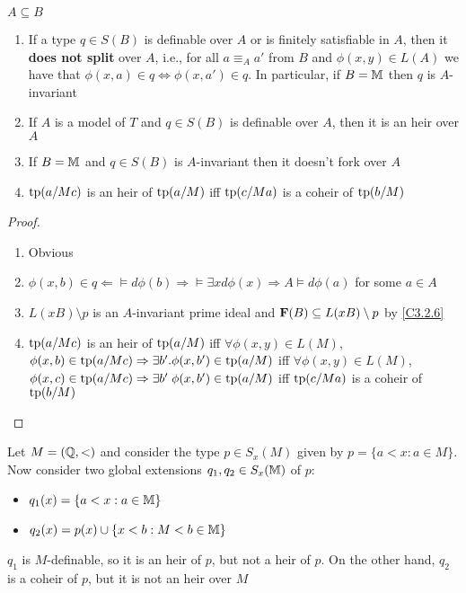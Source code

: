 \documentclass[11pt]{article}
\begin{document}
\begin{exercise}
\label{exC3.3.3}
\(A\subseteq B\)
\begin{enumerate}
\item If a type \(q\in S(B)\) is definable over \(A\) or is finitely satisfiable in \(A\), then it
\textbf{does not split} over \(A\), i.e., for all \(a\equiv_Aa'\) from \(B\) and \(\phi(x,y)\in L(A)\) we have
that \(\phi(x,a)\in q\Leftrightarrow\phi(x,a')\in q\). In particular, if \(B=\mathbb{M}\) then \(q\) is \(A\)-invariant
\item If \(A\) is a model of \(T\) and \(q\in S(B)\) is definable over \(A\), then it is an heir over \(A\)
\item If \(B=\mathbb{M}\) and \(q\in S(B)\) is \(A\)-invariant then it doesn't fork over \(A\)
\item \(\operatorname{tp}(a/Mc)\) is an heir of \(\operatorname{tp}(a/M)\) iff \(\operatorname{tp}(c/Ma)\) is a coheir of \(\operatorname{tp}(b/M)\)
\end{enumerate}
\end{exercise}

\begin{proof}
\begin{enumerate}
\item Obvious
\item \(\phi(x,b)\in q\Leftarrow\vDash d\phi(b)\Rightarrow\vDash\exists xd\phi(x)\Rightarrow A\vDash d\phi(a)\) for some \(a\in A\)
\item \(L(xB)\setminus p\) is an \(A\)-invariant prime ideal and \(\operatorname{\textbf{F}}(B)\subseteq L(xB)\setminus p\) by \ref{C3.2.6}
\item \(\operatorname{tp}(a/Mc)\) is an heir of \(\operatorname{tp}(a/M)\)
iff \(\forall\phi(x,y)\in L(M)\), \(\phi(x,b)\in\operatorname{tp}(a/Mc)\Rightarrow\exists b'.\phi(x,b')\in\operatorname{tp}(a/M)\) iff
\(\forall \phi(x,y)\in L(M)\), \(\phi(x,c)\in\operatorname{tp}(a/Mc)\Rightarrow\exists b'\;\phi(x,b')\in\operatorname{tp}(a/M)\) iff \(\operatorname{tp}(c/Ma)\) is a coheir
of \(\operatorname{tp}(b/M)\)
\end{enumerate}
\end{proof}

\begin{examplle}[]
Let \(M=(\mathbb{Q},<)\) and consider the type \(p\in S_x(M)\) given by \(p=\{a<x:a\in M\}\). Now consider two
global extensions \(q_1,q_2\in S_x(\mathbb{M})\) of \(p\):
\begin{itemize}
\item \(q_1(x)=\{a<x:a\in\mathbb{M}\}\)
\item \(q_2(x)=p(x)\cup\{x<b:M<b\in\mathbb{M}\}\)
\end{itemize}


\(q_1\) is \(M\)-definable, so it is an heir of \(p\), but not a heir of \(p\). On the other
hand, \(q_2\) is a coheir of \(p\), but it is not an heir over \(M\)
\end{examplle}
\end{document}
